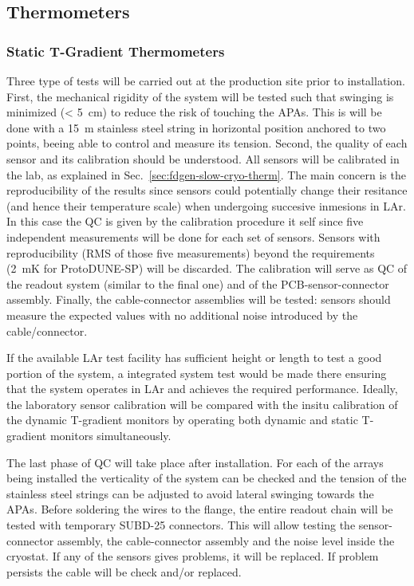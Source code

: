 \subsection{Thermometers}
\label{sec:fdgen-slow-cryo-qc-th}

\subsubsection{Static T-Gradient Thermometers}
\label{sec:fdgen-slow-cryo-qc-thst}


Three type of tests will be carried out at the production site prior to installation. First, the mechanical rigidity of the system will be tested such that swinging is minimized (< \SI{5}{cm})
to reduce the risk of touching the APAs. This is will be done with a \SI{15}{m} stainless steel string in horizontal position anchored to two points, beeing able to control and measure its tension. 
Second, the quality of each sensor and its calibration should be understood. All sensors will be calibrated in the lab, as explained in Sec.~\ref{sec:fdgen-slow-cryo-therm}.
The main concern is the reproducibility of the results since sensors could potentially change their resitance (and hence their temperature scale)
when undergoing succesive inmesions in LAr. In this case the QC is given by the calibration procedure it self since five independent measurements
will be done for each set of sensors. Sensors with reproducibility (RMS of those five measurements) beyond the requirements (\SI{2}{mK} for ProtoDUNE-SP) will be discarded.  
The calibration will serve as QC of the readout system (similar to the final one) and of the PCB-sensor-connector assembly. Finally, the cable-connector assemblies will
be tested: sensors should measure the expected values with no additional noise introduced by the cable/connector. 

If the available LAr test facility has sufficient height or length to test a good portion of the system, a integrated system test would be made there ensuring that the system
operates in LAr and achieves the required performance. Ideally, the laboratory sensor calibration will be compared with the insitu calibration
of the dynamic T-gradient monitors by operating both dynamic and static T-gradient monitors simultaneously.   

The last phase of QC will take place after installation. For each of the arrays being installed
the verticality of the system can be checked and the tension of the stainless steel strings can be adjusted to avoid lateral swinging towards the APAs. 
Before soldering the wires to the flange, the entire readout chain will be tested with temporary SUBD-25 connectors. 
This will allow testing the sensor-connector assembly, the cable-connector assembly and the noise level inside the cryostat.
If any of the sensors gives problems, it will be replaced. If problem persists the cable will be check and/or replaced.


